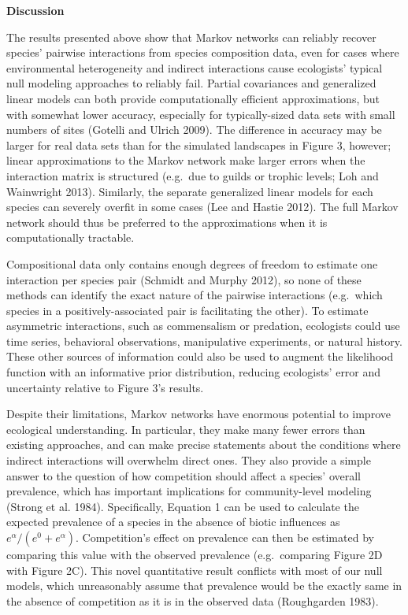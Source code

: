 \documentclass[12pt,]{article}
\begin{document}
\begin{spacing}{1.9}
\begin{flushleft}
\noindent
\textbf{Discussion}

\noindent
The results presented above show that Markov networks can reliably
recover species' pairwise interactions from species composition data,
even for cases where environmental heterogeneity and indirect
interactions cause ecologists' typical null modeling approaches to
reliably fail. Partial covariances and generalized linear models can
both provide computationally efficient approximations, but with somewhat
lower accuracy, especially for typically-sized data sets with small
numbers of sites (Gotelli and Ulrich 2009). The difference in accuracy
may be larger for real data sets than for the simulated landscapes in
Figure 3, however; linear approximations to the Markov network make
larger errors when the interaction matrix is structured (e.g.~due to
guilds or trophic levels; Loh and Wainwright 2013). Similarly, the
separate generalized linear models for each species can severely overfit
in some cases (Lee and Hastie 2012). The full Markov network should thus
be preferred to the approximations when it is computationally tractable.

Compositional data only contains enough degrees of freedom to estimate
one interaction per species pair (Schmidt and Murphy 2012), so none of
these methods can identify the exact nature of the pairwise interactions
(e.g.~which species in a positively-associated pair is facilitating the
other). To estimate asymmetric interactions, such as commensalism or
predation, ecologists could use time series, behavioral observations,
manipulative experiments, or natural history. These other sources of
information could also be used to augment the likelihood function with
an informative prior distribution, reducing ecologists' error and
uncertainty relative to Figure 3's results.

Despite their limitations, Markov networks have enormous potential to
improve ecological understanding. In particular, they make many fewer
errors than existing approaches, and can make precise statements about
the conditions where indirect interactions will overwhelm direct ones.
They also provide a simple answer to the question of how competition
should affect a species' overall prevalence, which has important
implications for community-level modeling (Strong et al. 1984).
Specifically, Equation 1 can be used to calculate the expected
prevalence of a species in the absence of biotic influences as
\(e^\alpha/(e^{0} + e^\alpha)\). Competition's effect on prevalence can
then be estimated by comparing this value with the observed prevalence
(e.g.~comparing Figure 2D with Figure 2C). This novel quantitative
result conflicts with most of our null models, which unreasonably assume
that prevalence would be the exactly same in the absence of competition
as it is in the observed data (Roughgarden 1983).


\end{flushleft}
\end{spacing}
\end{document}
